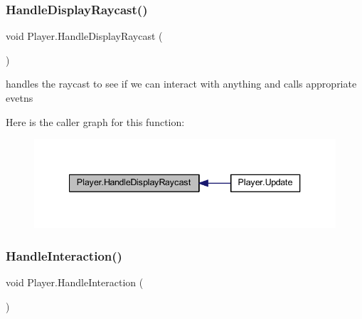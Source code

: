 \mbox{\label{class_player_a5f5cd09ca02aa4a73fb2df2828671596}} 
\subsubsection{\texorpdfstring{Handle\+Display\+Raycast()}{HandleDisplayRaycast()}}
{\footnotesize\ttfamily void Player.\+Handle\+Display\+Raycast (\begin{DoxyParamCaption}{ }\end{DoxyParamCaption})\hspace{0.3cm}{\ttfamily [private]}}



handles the raycast to see if we can interact with anything and calls appropriate evetns 

Here is the caller graph for this function\+:
\nopagebreak
\begin{figure}[H]
\begin{center}
\leavevmode
\includegraphics[width=340pt]{class_player_a5f5cd09ca02aa4a73fb2df2828671596_icgraph}
\end{center}
\end{figure}
\mbox{\label{class_player_a377a703ca99ceaf80d62874b2585c745}} 
\subsubsection{\texorpdfstring{Handle\+Interaction()}{HandleInteraction()}}
{\footnotesize\ttfamily void Player.\+Handle\+Interaction (\begin{DoxyParamCaption}{ }\end{DoxyParamCaption})\hspace{0.3cm}{\ttfamily [private]}}



